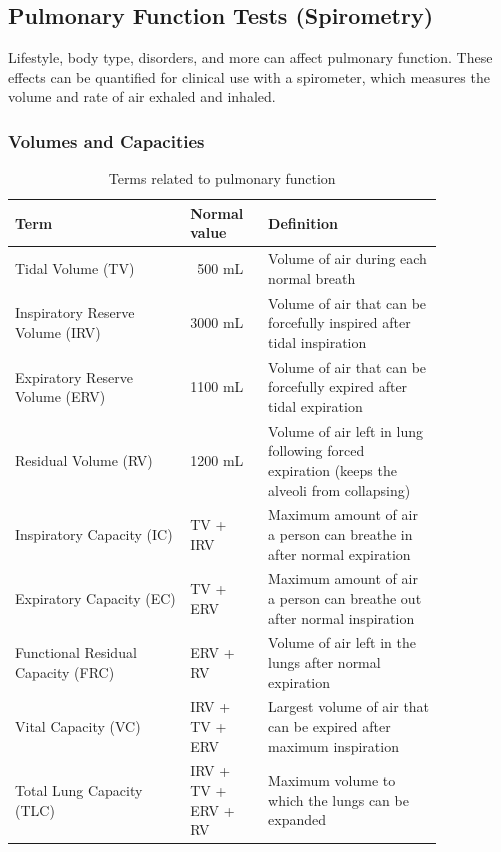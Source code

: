\documentclass{article}
\begin{document}
\subsection*{Pulmonary Function Tests (Spirometry)}
Lifestyle, body type, disorders, and more can affect pulmonary function. These effects can be quantified for clinical use with a spirometer, which measures the volume and rate of air exhaled and inhaled.

\subsubsection*{Volumes and Capacities}

	\begin{table}[h]
	\centering
	\caption{Terms related to pulmonary function}
	\begin{tabular}[h!]{p{0.35\linewidth}p{0.15\linewidth}p{0.35\linewidth}}
	\toprule
	Term & Normal value & Definition\\
	\midrule
	Tidal Volume (TV) & ~500 mL & Volume of air during each normal breath\\\midrule
	Inspiratory Reserve Volume (IRV) & 3000 mL & Volume of air that can be forcefully inspired after tidal inspiration\\\midrule
	Expiratory Reserve Volume (ERV) & 1100 mL & Volume of air that can be forcefully expired after tidal expiration\\\midrule
	Residual Volume (RV) & 1200 mL & Volume of air left in lung following forced expiration (keeps the alveoli from collapsing)\\\midrule
	Inspiratory Capacity (IC) & TV + IRV & Maximum amount of air a person can breathe in after normal expiration\\\midrule
	Expiratory Capacity (EC) & TV + ERV & Maximum amount of air a person can breathe out after normal inspiration\\\midrule
	Functional Residual Capacity (FRC) & ERV + RV & Volume of air left in the lungs after normal expiration\\\midrule
	Vital Capacity (VC) & IRV + TV + ERV & Largest volume of air that can be expired after maximum inspiration\\\midrule
	Total Lung Capacity (TLC) & IRV + TV + ERV + RV & Maximum volume to which the lungs can be expanded\\
	\bottomrule
	\end{tabular}
	\label{volumes}
	\end{table}
\end{document}
